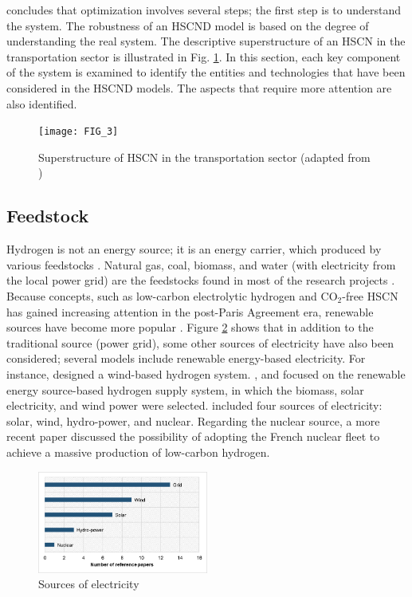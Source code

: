 \documentclass[11pt,3p]{elsarticle}
\begin{document}
\citet{diwekar2008introduction} concludes that optimization involves several steps; the first step is to understand the system. The robustness of an HSCND model is based on the degree of understanding the real system. The descriptive superstructure of an HSCN in the transportation sector is illustrated in Fig. \ref{fig:Superstructure}. In this section, each key component of the system is examined to identify the entities and technologies that have been considered in the HSCND models. The aspects that require more attention are also identified.

\begin{figure}[!htbp]
\centering\texttt{[image: FIG\_3]}
\caption{\label{fig:Superstructure}Superstructure of HSCN in the transportation sector (adapted from \citet{moreno2017towards})}
\end{figure}

\subsection{Feedstock}

Hydrogen is not an energy source; it is an energy carrier, which produced by various feedstocks \citep{ren2013sustainability}. Natural gas, coal, biomass, and water (with electricity from the local power grid) are the feedstocks found in most of the research projects \citep{agnolucci2013importance,almansoori2012design,kim2008optimization,kim2008strategic,nunes2015design}. Because concepts, such as low-carbon electrolytic hydrogen and CO$_{2}$-free HSCN has gained increasing attention in the post-Paris Agreement era, renewable sources have become more popular \citep{abbasi2011renewable,chattanathan2012review}. Figure \ref{fig:SourceElectricity} shows that in addition to the traditional source (power grid), some other sources of electricity have also been considered; several models include renewable energy-based electricity. For instance, \citet{kim2017integrated} designed a wind-based hydrogen system. \citet{won2017design}, and \citet{kim2016optimization} focused on the renewable energy source-based hydrogen supply system, in which the biomass, solar electricity, and wind power were selected. \citet{almaraz2014hydrogen} included four sources of electricity: solar, wind, hydro-power, and nuclear. Regarding the nuclear source, a more recent paper \citep{cany2017adapting} discussed the possibility of adopting the French nuclear fleet to achieve a massive production of low-carbon hydrogen.

\begin{figure}[!htbp]
\centering\includegraphics[width=0.5\textwidth]{FIG_4}
\caption{\label{fig:SourceElectricity}Sources of electricity}
\end{figure}
\end{document}
